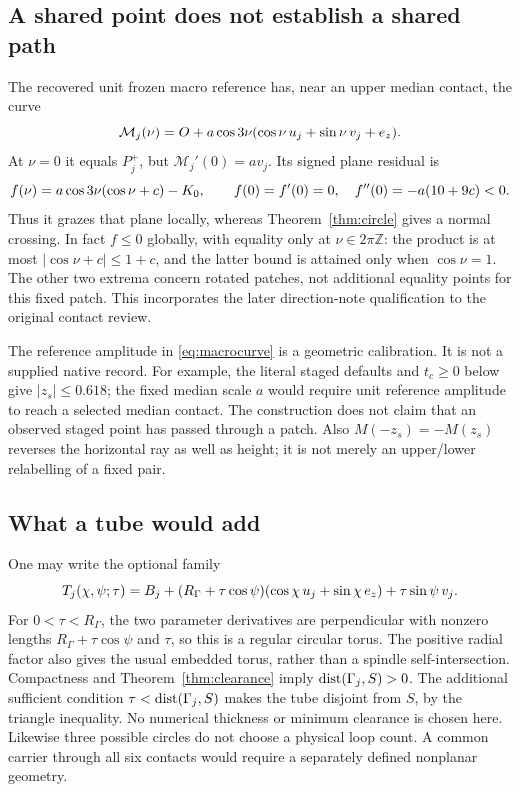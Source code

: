 \subsection{A shared point does not establish a shared path}\label{sec:grazing}
The recovered unit frozen macro reference has, near an upper median contact, the curve
\begin{equation}\label{eq:macrocurve}
\mathcal M_j(\nu)=O+a\cos3\nu(\cos\nu\,u_j+\sin\nu\,v_j+e_z).
\end{equation}
At $\nu=0$ it equals $P_j^+$, but $\mathcal M_j'(0)=a v_j$. Its signed plane residual is
\[
f(\nu)=a\cos3\nu(\cos\nu+c)-K_0,\qquad
f(0)=f'(0)=0,\quad f''(0)=-a(10+9c)<0.
\]
Thus it grazes that plane locally, whereas Theorem~\ref{thm:circle} gives a normal crossing. In fact $f\le0$ globally, with equality only at $\nu\in2\pi\mathbb Z$: the product is at most $|\cos\nu+c|\le1+c$, and the latter bound is attained only when $\cos\nu=1$. The other two extrema concern rotated patches, not additional equality points for this fixed patch. This incorporates the later direction-note qualification to the original contact review.~\cite[Sec.~5.4]{GateDirections}

The reference amplitude in \eqref{eq:macrocurve} is a geometric calibration. It is not a supplied native record. For example, the literal staged defaults and $t_c\ge0$ below give $|z_s|\le0.618$; the fixed median scale $a$ would require unit reference amplitude to reach a selected median contact. The construction does not claim that an observed staged point has passed through a patch. Also $M(-z_s)=-M(z_s)$ reverses the horizontal ray as well as height; it is not merely an upper/lower relabelling of a fixed pair.~\cite[Sec.~5.1]{GateDirections}

\subsection{What a tube would add}
One may write the optional family
\begin{equation}\label{eq:tube}
T_j(\chi,\psi;\tau)=B_j+(R_\Gamma+\tau\cos\psi)
(\cos\chi\,u_j+\sin\chi\,e_z)+\tau\sin\psi\,v_j.
\end{equation}
For $0<\tau<R_\Gamma$, the two parameter derivatives are perpendicular with nonzero lengths $R_\Gamma+\tau\cos\psi$ and $\tau$, so this is a regular circular torus. The positive radial factor also gives the usual embedded torus, rather than a spindle self-intersection. Compactness and Theorem~\ref{thm:clearance} imply $\operatorname{dist}(\Gamma_j,S)>0$. The additional sufficient condition $\tau<\operatorname{dist}(\Gamma_j,S)$ makes the tube disjoint from $S$, by the triangle inequality. No numerical thickness or minimum clearance is chosen here. Likewise three possible circles do not choose a physical loop count. A common carrier through all six contacts would require a separately defined nonplanar geometry.


